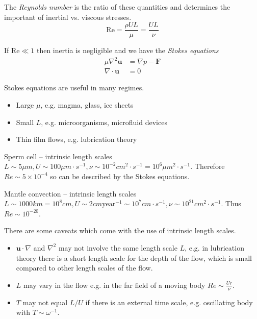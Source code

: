 \documentclass{jknotes}
\begin{document}
\begin{defn}
The \emph{Reynolds number} is the ratio of these quantities and determines the
important of inertial vs. viscous stresses. 
\begin{equation}
	\text{Re} = \frac{\rho U L}{\mu} = \frac{U L}{\nu}
\end{equation}
\end{defn}

If $\text{Re} \ll 1$ then inertia is negligible and we have the \emph{Stokes
equations}
\begin{equation}
	\begin{aligned}
		\mu \nabla^2 \bm{u} &= \nabla p - \bm{F} \\
		\nabla \cdot \bm{u} &= 0
	\end{aligned}
\end{equation}

Stokes equations are useful in many regimes.
\begin{itemize}
	\item Large $\mu$, e.g. magma, glass, ice sheets
	\item Small $L$, e.g. microorganisms, microfluid devices
	\item Thin film flows, e.g. lubrication theory
\end{itemize}
\begin{eg}
	Sperm cell -- intrinsic length scales $L \sim 5 \mu m, U \sim 100 \mu m
	\cdot s^{-1}, \nu \sim 10^{-2} cm^2 \cdot s^{-1} = 10^6 \mu m^2 \cdot
	s^{-1}$. Therefore $Re \sim 5 \times 10^{-4}$ so can be described by the
	Stokes equations.
\end{eg}

\begin{eg}
	Mantle convection -- intrinsic length scales $L \sim 1000 km = 10^8 cm, U
	\sim 2 cm \text{year}^{-1} \sim 10^7 cm \cdot s^{-1}, \nu \sim 10^{21}
	cm^2 \cdot s^{-1}$. Thus $Re \sim 10^{-20}$.
\end{eg}

There are some caveats which come with the use of intrinsic length scales.
\begin{itemize}
	\item $\bm{u} \cdot \nabla$ and $\nabla^2$ may not involve the same length
		scale $L$, e.g. in lubrication theory there is a short length scale
		for the depth of the flow, which is small compared to other length
		scales of the flow.
	\item $L$ may vary in the flow e.g. in the far field of a moving body $Re
		\sim \frac{Ur}{\nu}$.
	\item $T$ may not equal $L/U$ if there is an external time scale, e.g.
		oscillating body with $T \sim \omega^{-1}$.
\end{itemize}
\end{document}
